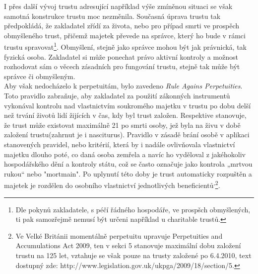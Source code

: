 \documentclass{article}
\begin{document}
I přes další vývoj trustu adresující například výše zmíněnou situaci se však samotná konstrukce trustu moc nezměnila. Současná úprava trustu tak předpokládá, že zakladatel zřídí za života, nebo pro případ smrti ve prospěch obmyšleného trust, přičemž majetek převede na správce, který ho bude v rámci trustu spravovat\footnote{Dle pokynů zakladatele, s péčí řádného hospodáře, ve prospšch obmyšlených, ti pak samozřejmě nemusí být určeni například u charitable trustů.}. Obmyšlení, stejně jako správce mohou být jak právnická, tak fyzická osoba. Zakladatel si může ponechat právo aktivní kontroly a možnost rozhodovat sám o věcech zásadních pro fungování trustu, stejně tak může být správce či obmyšleným.\\

Aby však nedocházelo k perpetuitám, bylo zavedeno \textit{Rule Agains Perpetuities}. Toto pravidlo zabraňuje, aby zakladatel za použití zákonných instrumentů vykonával kontrolu nad vlastnictvím soukromého majetku v trustu po dobu delší než trvání životů lidí žijících v čas, kdy byl trust založen. Respektive stanovuje, že trust může existovat maximálně 21 po smrti osoby, jež byla na živu v době založení trustu(zahrnut je i nasciturus). Pravidlo v zásadě brání osobě v aplikaci stanovených pravidel, nebo kritérií, která by i nadále ovlivňovala vlastnictví majetku dlouho poté, co daná osoba zemřela a navíc ho vyděloval z jakéhokoliv hospodářského dění a kontroly státu, což se často označuje jako kontrola „mrtvou rukou“ nebo "mortmain". Po uplynutí této doby je trust automaticky rozpuštěn a majetek je rozdělen do osobního vlastnictví jednotlivých beneficientů\textsuperscript{,}\footnote{Ve Velké Británii momentálně perpetuitu upravuje Perpetuities and Accumulations Act 2009, ten v sekci 5 stanovuje maximální dobu založení trustu na 125 let, vztahuje se však pouze na trusty založené po 6.4.2010, text dostupný zde: http://www.legislation.gov.uk/ukpga/2009/18/section/5.}.\\



\end{document}
